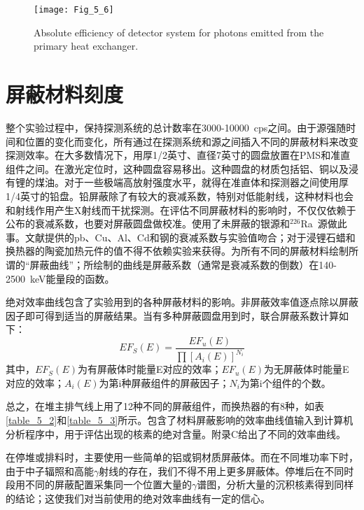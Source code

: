 \begin{figure}
\centering
\texttt{[image: Fig\_5\_6]}
\caption{Absolute efficiency of detector system for photons emitted from the primary heat exchanger.}
\label{Fig_5_6}
\end{figure}

\section{屏蔽材料刻度}
整个实验过程中，保持探测系统的总计数率在3000-10000\ cps之间。由于源强随时间和位置的变化而变化，所有通过在探测系统和源之间插入不同的屏蔽材料来改变探测效率。在大多数情况下，用厚1/2英寸、直径7英寸的圆盘放置在PMS和准直组件之间。在激光定位时，这种圆盘容易移出。这种圆盘的材质包括铝、铜以及浸有锂的煤油。对于一些极端高放射强度水平，就得在准直体和探测器之间使用厚1/4英寸的铅盘。铅屏蔽除了有较大的衰减系数，特别对低能射线，这种材料也会和射线作用产生X射线而干扰探测。在评估不同屏蔽材料的影响时，不仅仅依赖于公布的衰减系数，也要对屏蔽圆盘做校准。使用了未屏蔽的银源和$^{226}$Ra\ 源做此事。文献提供的pb、Cu、Al、Cd和钢的衰减系数与实验值吻合；对于浸锂石蜡和换热器的陶瓷加热元件的值不得不依赖实验来获得。为所有不同的屏蔽材料绘制所谓的“屏蔽曲线”；所绘制的曲线是屏蔽系数（通常是衰减系数的倒数）在140-2500\ keV能量段的函数。

绝对效率曲线包含了实验用到的各种屏蔽材料的影响。非屏蔽效率值逐点除以屏蔽因子即可得到适当的屏蔽结果。当有多种屏蔽圆盘用到时，联合屏蔽系数计算如下：
\begin{equation}
EF_S(E)=\frac{EF_u(E)}{\prod [A_i(E)]^{N_i}}
\end{equation}
其中，$EF_S(E)$为有屏蔽体时能量E对应的效率；$EF_u(E)$为无屏蔽体时能量E对应的效率；$A_i(E)$为第i种屏蔽组件的屏蔽因子；$N_i$为第i个组件的个数。

总之，在堆主排气线上用了12种不同的屏蔽组件，而换热器的有8种，如表\ref{table_5_2}和\ref{table_5_3}所示。包含了材料屏蔽影响的效率曲线值输入到计算机分析程序中，用于评估出现的核素的绝对含量。附录C给出了不同的效率曲线。

在停堆或排料时，主要使用一些简单的铝或铜材质屏蔽体。而在不同堆功率下时，由于中子辐照和高能$\gamma$射线的存在，我们不得不用上更多屏蔽体。停堆后在不同时段用不同的屏蔽配置采集同一个位置大量的$\gamma$谱图，分析大量的沉积核素得到同样的结论；这使我们对当前使用的绝对效率曲线有一定的信心。

